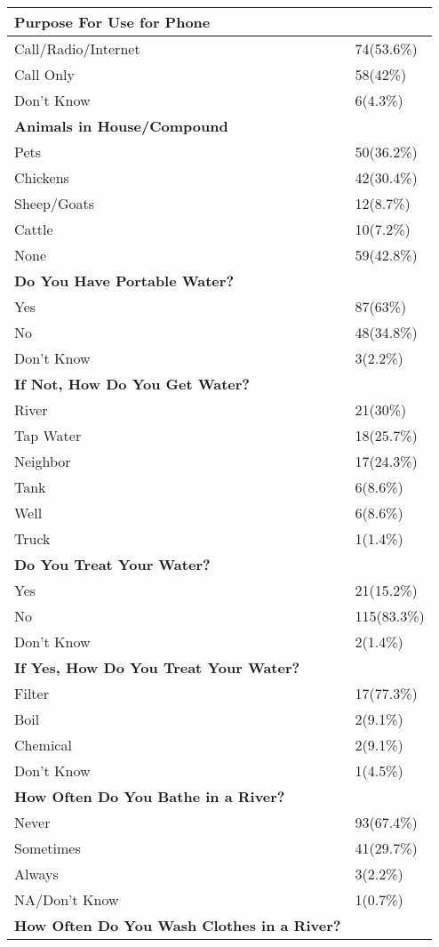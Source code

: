 \documentclass[6pt,letterpaper]{article}
\begin{document}
\begin{tabular}{|l  l|}
\hline
\textbf{Purpose For Use for Phone} \\
\hline
Call/Radio/Internet & 74(53.6\%) \\
Call Only & 58(42\%) \\
Don't Know & 6(4.3\%) \\
\hline
\textbf{Animals in House/Compound} & \\
\hline
Pets & 50(36.2\%) \\
Chickens & 42(30.4\%) \\
Sheep/Goats & 12(8.7\%) \\
Cattle & 10(7.2\%) \\
None & 59(42.8\%) \\
\hline
\textbf{Do You Have Portable Water?} \\
\hline
Yes & 87(63\%) \\
No & 48(34.8\%) \\
Don't Know & 3(2.2\%) \\
\hline
\textbf{If Not, How Do You Get Water?} \\
\hline
River & 21(30\%) \\
Tap Water & 18(25.7\%) \\
Neighbor & 17(24.3\%) \\
Tank & 6(8.6\%) \\
Well & 6(8.6\%) \\
Truck & 1(1.4\%) \\
\hline
\textbf{Do You Treat Your Water?} \\
\hline
Yes & 21(15.2\%) \\
No & 115(83.3\%) \\
Don't Know & 2(1.4\%) \\
\hline
\textbf{If Yes, How Do You Treat Your Water?} \\
\hline
Filter & 17(77.3\%) \\
Boil & 2(9.1\%) \\
Chemical & 2(9.1\%) \\
Don't Know & 1(4.5\%) \\
\hline
\textbf{How Often Do You Bathe in a River?} \\
\hline
Never & 93(67.4\%) \\
Sometimes & 41(29.7\%) \\
Always & 3(2.2\%) \\
NA/Don't Know & 1(0.7\%) \\
\hline
\textbf{How Often Do You Wash Clothes in a River?} \\

\end{tabular}
\end{document}
